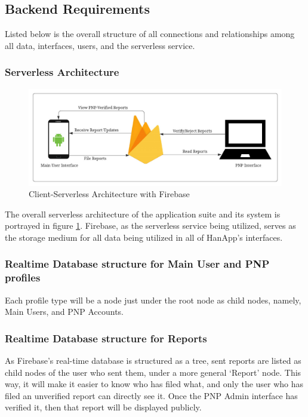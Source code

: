 \subsection{Backend Requirements}

Listed below is the overall structure of all connections and relationships among all data, interfaces, users, and the serverless service. 

\subsubsection{Serverless Architecture}

\begin{figure}[!h]
    \centering
    \includegraphics[width=\textwidth]{figures/Chapter3/Chapt3_ServerlessArchitecture.jpeg}
    \caption{Client-Serverless Architecture with Firebase}
    \label{fig:ServerlessFirebase}
\end{figure}

The overall serverless architecture of the application suite and its system is portrayed in figure \ref{fig:ServerlessFirebase}. Firebase, as the serverless service being utilized, serves as the storage medium for all data being utilized in all of HanApp’s interfaces. 

\subsubsection{Realtime Database structure for Main User and PNP profiles}

Each profile type will be a node just under the root node as child nodes, namely, Main Users, and PNP Accounts. 

\subsubsection{Realtime Database structure for Reports}
As Firebase’s real-time database is structured as a tree, sent reports are listed as child nodes of the user who sent them, under a more general `Report' node. This way, it will make it easier to know who has filed what, and only the user who has filed an unverified report can directly see it. Once the PNP Admin interface has verified it, then that report will be displayed publicly.

